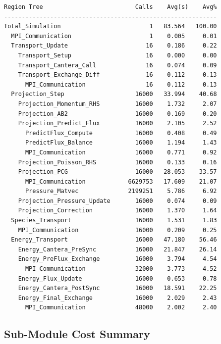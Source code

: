 \documentclass[11pt]{article}
\begin{document}
\begin{lstlisting}[style=profiletree]
Region Tree                          Calls    Avg(s)    Avg%
------------------------------------------------------------
Total_Simulation                         1   83.564   100.00
  MPI_Communication                      1    0.005     0.01
  Transport_Update                      16    0.186     0.22
    Transport_Setup                     16    0.000     0.00
    Transport_Cantera_Call              16    0.074     0.09
    Transport_Exchange_Diff             16    0.112     0.13
      MPI_Communication                 16    0.112     0.13
  Projection_Step                    16000   33.994    40.68
    Projection_Momentum_RHS          16000    1.732     2.07
    Projection_AB2                   16000    0.169     0.20
    Projection_Predict_Flux          16000    2.105     2.52
      PredictFlux_Compute            16000    0.408     0.49
      PredictFlux_Balance            16000    1.194     1.43
      MPI_Communication              16000    0.771     0.92
    Projection_Poisson_RHS           16000    0.133     0.16
    Projection_PCG                   16000   28.053    33.57
      MPI_Communication            6629753   17.609    21.07
      Pressure_Matvec              2199251    5.786     6.92
    Projection_Pressure_Update       16000    0.074     0.09
    Projection_Correction            16000    1.370     1.64
  Species_Transport                  16000    1.531     1.83
    MPI_Communication                16000    0.209     0.25
  Energy_Transport                   16000   47.180    56.46
    Energy_Cantera_PreSync           16000   21.847    26.14
    Energy_PreFlux_Exchange          16000    3.794     4.54
      MPI_Communication              32000    3.773     4.52
    Energy_Flux_Update               16000    0.653     0.78
    Energy_Cantera_PostSync          16000   18.591    22.25
    Energy_Final_Exchange            16000    2.029     2.43
      MPI_Communication              48000    2.002     2.40
\end{lstlisting}

\subsection{Sub-Module Cost Summary}
\end{document}
